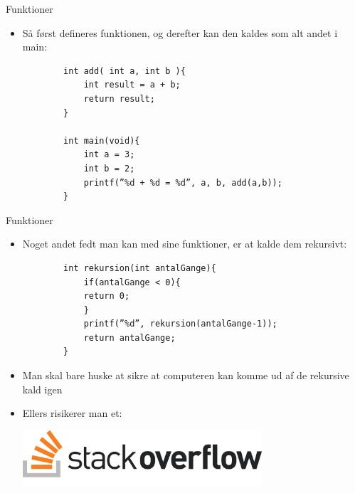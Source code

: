 \documentclass{beamer}
\begin{document}

\begin{frame}[fragile]{Funktioner}
	\begin{itemize}
		\item{Så først defineres funktionen, og derefter  kan den kaldes som alt andet i main:}
		\begin{lstlisting}
		int add( int a, int b ){
			int result = a + b;
			return result;
		}

		int main(void){
			int a = 3;
			int b = 2;
			printf(”%d + %d = %d”, a, b, add(a,b));
		}
		\end{lstlisting}
	\end{itemize}
\end{frame}


\begin{frame}[fragile]{Funktioner}
	\begin{itemize}
		\item{Noget andet fedt man kan med sine funktioner, er at kalde dem rekursivt:}
		\begin{lstlisting}
		int rekursion(int antalGange){
			if(antalGange < 0){
			return 0;
			}
			printf(”%d”, rekursion(antalGange-1));
			return antalGange;
		}
		\end{lstlisting}
		\item{Man skal bare huske at sikre at computeren kan komme ud af de rekursive kald igen}
		\item{Ellers risikerer man et:}
		\begin{center}
		\includegraphics[width=0.7\textwidth]{assets/so-logo.png}
	\end{center}
	\end{itemize}
\end{frame}

\end{document}
